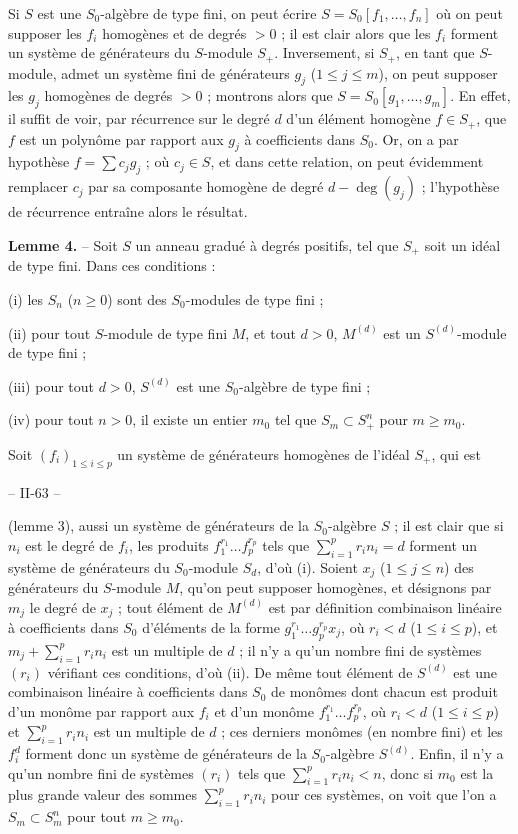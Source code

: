 Si $S$ est une $S_0$-algèbre de type fini, on peut écrire $S = S_0[f_1, \dots, f_n]$ où on peut supposer les $f_i$ homogènes et de degrés $> 0$ ; il est clair alors que les $f_i$ forment un système de générateurs du $S$-module $S_+$. Inversement, si $S_+$, en tant que $S$-module, admet un système fini de générateurs $g_j$ ($1 \le j \le m$), on peut supposer les $g_j$ homogènes de degrés $> 0$ ; montrons alors que $S = S_0[g_1, \dots, g_m]$. En effet, il suffit de voir, par récurrence sur le degré $d$ d'un élément homogène $f \in S_+$, que $f$ est un polynôme par rapport aux $g_j$ à coefficients dans $S_0$. Or, on a par hypothèse $f = \sum c_j g_j$ ; où $c_j \in S$, et dans cette relation, on peut évidemment remplacer $c_j$ par sa composante homogène de degré $d - \deg(g_j)$ ; l'hypothèse de récurrence entraîne alors le résultat.

\textbf{Lemme 4.} -- Soit $S$ un anneau gradué à degrés positifs, tel que $S_+$ soit un idéal de type fini. Dans ces conditions :

(i) les $S_n$ ($n \ge 0$) sont des $S_0$-modules de type fini ;

(ii) pour tout $S$-module de type fini $M$, et tout $d > 0$, $M^{(d)}$ est un $S^{(d)}$-module de type fini ;

(iii) pour tout $d > 0$, $S^{(d)}$ est une $S_0$-algèbre de type fini ;

(iv) pour tout $n > 0$, il existe un entier $m_0$ tel que $S_m \subset S_+^n$ pour $m \ge m_0$.

Soit $(f_i)_{1 \le i \le p}$ un système de générateurs homogènes de l'idéal $S_+$, qui est

\newpage


-- II-63 --

(lemme 3), aussi un système de générateurs de la $S_0$-algèbre $S$ ; il est clair que si $n_i$ est le degré de $f_i$, les produits $f_1^{r_1} \dots f_p^{r_p}$ tels que $\sum_{i=1}^p r_i n_i = d$ forment un système de générateurs du $S_0$-module $S_d$, d'où (i).
Soient $x_j$ ($1 \le j \le n$) des générateurs du $S$-module $M$, qu'on peut supposer homogènes, et désignons par $m_j$ le degré de $x_j$ ; tout élément de $M^{(d)}$ est par définition combinaison linéaire à coefficients dans $S_0$ d'éléments de la forme $g_1^{r_1} \dots g_p^{r_p} x_j$, où $r_i < d$ ($1 \le i \le p$), et $m_j + \sum_{i=1}^p r_i n_i$ est un multiple de $d$ ; il n'y a qu'un nombre fini de systèmes $(r_i)$ vérifiant ces conditions, d'où (ii). De même tout élément de $S^{(d)}$ est une combinaison linéaire à coefficients dans $S_0$ de monômes dont chacun est produit d'un monôme par rapport aux $f_i$ et d'un monôme $f_1^{r_1} \dots f_p^{r_p}$, où $r_i < d$ ($1 \le i \le p$) et $\sum_{i=1}^p r_i n_i$ est un multiple de $d$ ; ces derniers monômes (en nombre fini) et les $f_i^d$ forment donc un système de générateurs de la $S_0$-algèbre $S^{(d)}$. Enfin, il n'y a qu'un nombre fini de systèmes $(r_i)$ tels que $\sum_{i=1}^p r_i n_i < n$, donc si $m_0$ est la plus grande valeur des sommes $\sum_{i=1}^p r_i n_i$ pour ces systèmes, on voit que l'on a $S_m \subset S_m^n$ pour tout $m \ge m_0$.

